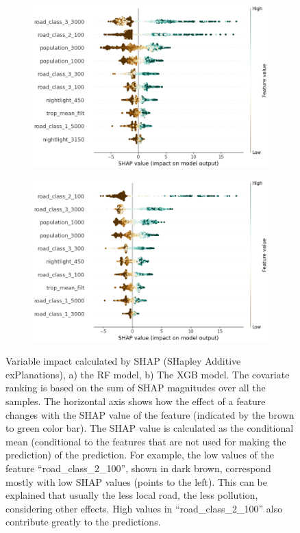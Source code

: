 \documentclass{article}
\begin{document}
\begin{figure}
\begin{subfigure}{.5\textwidth}
  \centering
\includegraphics[scale = 0.3]{fig/rfshap.png}
  \caption{}
  \label{fig:sfig1}
\end{subfigure}%
\begin{subfigure}{.5\textwidth}
  \centering
  \includegraphics[scale = 0.3]{fig/xgbshap.png}
  \caption{}
  \label{fig:sfig2}
\end{subfigure}
\caption{Variable impact calculated by SHAP (SHapley Additive exPlanations), a) the RF model, b) The XGB model. The covariate ranking is based on the sum of SHAP magnitudes over all the samples. The horizontal axis shows how the effect of a feature changes with the SHAP value of the feature (indicated by the brown to green color bar). The SHAP value is calculated as the conditional mean (conditional to the features that are not used for making the prediction) of the prediction. For example, the low values of the feature “road\_class\_2\_100”, shown in dark brown, correspond mostly with low SHAP values (points to the left). This can be explained that usually the less local road, the less pollution, considering other effects. High values in “road\_class\_2\_100” also contribute greatly to the predictions.
}
\label{fig:rfxgbshap}
\end{figure}
  
\end{document}
